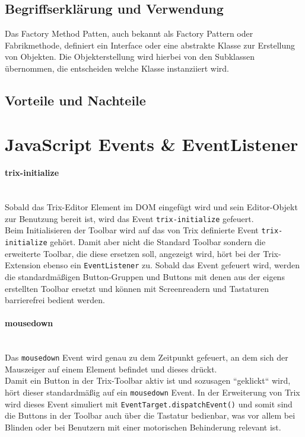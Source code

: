 \subsection{Begriffserklärung und Verwendung}
Das Factory Method Patten, auch bekannt als Factory Pattern oder Fabrikmethode, definiert ein Interface oder eine abstrakte Klasse zur Erstellung von Objekten. Die Objekterstellung wird hierbei von den Subklassen übernommen, die entscheiden welche Klasse instanziiert wird. 

\subsection{Vorteile und Nachteile}


\section{JavaScript Events \& EventListener}
\paragraph{trix-initialize}\mbox{}\\
Sobald das Trix-Editor Element im DOM eingefügt wird und sein Editor-Objekt zur Benutzung bereit ist, wird das Event \texttt{trix-initialize} gefeuert.\\
Beim Initialisieren der Toolbar wird auf das von Trix definierte Event \texttt{trix-initialize} gehört. Damit aber nicht die Standard Toolbar sondern die erweiterte Toolbar, die diese ersetzen soll, angezeigt wird, hört bei der Trix-Extension ebenso ein \texttt{EventListener} zu. Sobald das Event gefeuert wird, werden die standardmäßigen Button-Gruppen und Buttons mit denen aus der eigens erstellten Toolbar ersetzt und können mit Screenreadern und Tastaturen barrierefrei bedient werden.

\paragraph{mousedown}\mbox{}\\
Das \texttt{mousedown} Event wird genau zu dem Zeitpunkt gefeuert, an dem sich der Mauszeiger auf einem Element befindet und dieses drückt.\\
Damit ein Button in der Trix-Toolbar aktiv ist und sozusagen ``geklickt`` wird, hört dieser standardmäßig auf ein \texttt{mousedown} Event. In der Erweiterung von Trix wird dieses Event simuliert mit \texttt{EventTarget.dispatchEvent()} und somit sind die Buttons in der Toolbar auch über die Tastatur bedienbar, was vor allem bei Blinden oder bei Benutzern mit einer motorischen Behinderung relevant ist.

